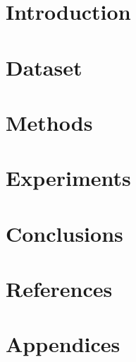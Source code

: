\documentclass[12pt]{article}
\begin{document}

\restoregeometry

\setcounter{tocdepth}{5}
\tableofcontents
\pagebreak

\listoffigures
\listoftables
\pagebreak

\justify

\section{Introduction}


\section{Dataset}


\section{Methods}


\section{Experiments}


\section{Conclusions}


\section{References}
\label{sec:ref}
\printbibliography[heading=none]

\section{Appendices}

\end{document}
